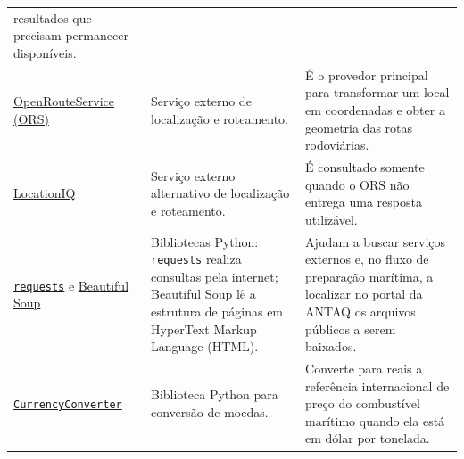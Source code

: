 \documentclass[brazil,]{article}
\begin{document}
\begin{longtable}[]{@{}lll@{}}
\begin{minipage}[t]{0.30\columnwidth}
resultados que precisam permanecer disponíveis.\strut
\end{minipage}\tabularnewline
\begin{minipage}[t]{0.30\columnwidth}\raggedright
\href{https://openrouteservice.org/}{OpenRouteService (ORS)}\strut
\end{minipage} & \begin{minipage}[t]{0.30\columnwidth}\raggedright
Serviço externo de localização e roteamento.\strut
\end{minipage} & \begin{minipage}[t]{0.30\columnwidth}\raggedright
É o provedor principal para transformar um local em coordenadas e obter
a geometria das rotas rodoviárias.\strut
\end{minipage}\tabularnewline
\begin{minipage}[t]{0.30\columnwidth}\raggedright
\href{https://locationiq.com/}{LocationIQ}\strut
\end{minipage} & \begin{minipage}[t]{0.30\columnwidth}\raggedright
Serviço externo alternativo de localização e roteamento.\strut
\end{minipage} & \begin{minipage}[t]{0.30\columnwidth}\raggedright
É consultado somente quando o ORS não entrega uma resposta
utilizável.\strut
\end{minipage}\tabularnewline
\begin{minipage}[t]{0.30\columnwidth}\raggedright
\href{https://requests.readthedocs.io/en/stable/}{\texttt{requests}} e
\href{https://www.crummy.com/software/BeautifulSoup/bs4/doc/}{Beautiful
Soup}\strut
\end{minipage} & \begin{minipage}[t]{0.30\columnwidth}\raggedright
Bibliotecas Python: \texttt{requests} realiza consultas pela internet;
Beautiful Soup lê a estrutura de páginas em HyperText Markup Language
(HTML).\strut
\end{minipage} & \begin{minipage}[t]{0.30\columnwidth}\raggedright
Ajudam a buscar serviços externos e, no fluxo de preparação marítima, a
localizar no portal da ANTAQ os arquivos públicos a serem
baixados.\strut
\end{minipage}\tabularnewline
\begin{minipage}[t]{0.30\columnwidth}\raggedright
\href{https://pypi.org/project/CurrencyConverter/}{\texttt{CurrencyConverter}}\strut
\end{minipage} & \begin{minipage}[t]{0.30\columnwidth}\raggedright
Biblioteca Python para conversão de moedas.\strut
\end{minipage} & \begin{minipage}[t]{0.30\columnwidth}\raggedright
Converte para reais a referência internacional de preço do combustível
marítimo quando ela está em dólar por tonelada.\strut
\end{minipage}\tabularnewline
\bottomrule
\end{longtable}
\end{document}
